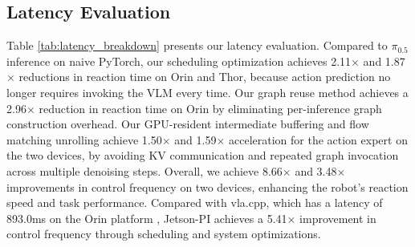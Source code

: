 \subsection{Latency Evaluation}
Table \ref{tab:latency_breakdown} presents our latency evaluation. Compared to $\pi_{0.5}$ inference on naive PyTorch, our scheduling optimization achieves 2.11$\times$ and 1.87$\times$ reductions in reaction time on Orin and Thor, because action prediction no longer requires invoking the VLM every time. Our graph reuse method achieves a 2.96$\times$ reduction in reaction time on Orin by eliminating per-inference graph construction overhead. Our GPU-resident intermediate buffering and flow matching unrolling achieve 1.50$\times$ and 1.59$\times$ acceleration for the action expert on the two devices, by avoiding KV communication and repeated graph invocation across multiple denoising steps. Overall, we achieve 8.66$\times$ and 3.48$\times$ improvements in control frequency on two devices, enhancing the robot's reaction speed and task performance. Compared with vla.cpp, which has a latency of 893.0ms on the Orin platform \cite{nguyen2026vla}, Jetson-PI achieves a 5.41× improvement in control frequency through scheduling and system optimizations.





